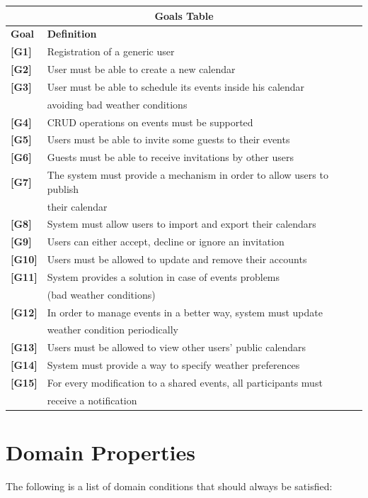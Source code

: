 \documentclass[12pt]{book}
\begin{document}
	\begin{tabular}{ |l|l| }
  		\hline
  		\hline
  		\multicolumn{2}{|c|}{\large{\textbf{Goals Table}}} \\
  		\hline
  		\hline
  		\textbf{Goal} & \textbf{Definition} \\
  		\hline
  			\textbf{[G1]} & Registration of a generic user\\
 		 	\textbf{[G2]} & User must be able to create a new calendar\\
			\textbf{[G3]} & User must be able to schedule its events inside his calendar\\ & avoiding bad weather conditions\\
			\textbf{[G4]} & CRUD operations on events must be supported\\
			\textbf{[G5]} & Users must be able to invite some guests to their events\\
			\textbf{[G6]} & Guests must be able to receive invitations by other users \\
			\textbf{[G7]} & The system must provide a mechanism in order to allow users to publish\\& their calendar\\
			\textbf{[G8]} & System must allow users to import and export their calendars\\
			\textbf{[G9]} & Users can either accept, decline or ignore an invitation \\
			\textbf{[G10]} & Users must be allowed to update and remove their accounts\\
			\textbf{[G11]} & System provides a solution in case of events problems \\&(bad weather conditions) \\
			\textbf{[G12]} & In order to manage events in a better way, system must update\\& weather condition periodically\\
			\textbf{[G13]} & Users must be allowed to view other users' public calendars \\ 
			\textbf{[G14]} & System must provide a way to specify weather preferences \\ 
			\textbf{[G15]} & For every modification to a shared events, all participants must\\& receive a notification\\
  		\hline 
  		\hline
	\end{tabular}  
\vspace{8cm}
\newpage

\section {Domain Properties}
The following is a list of domain conditions that should always be satisfied: \\
\end{document}
